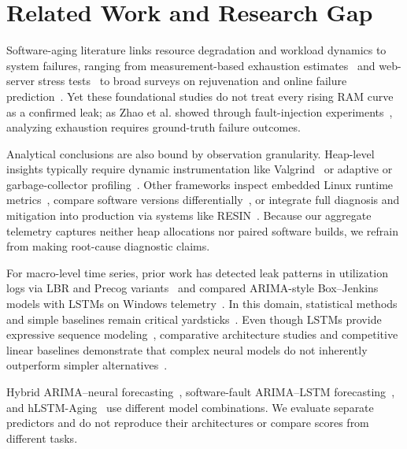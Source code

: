 \documentclass{llncs}
\begin{document}
\section{Related Work and Research Gap}
Software-aging literature links resource degradation and workload dynamics to system failures, ranging from measurement-based exhaustion estimates~\cite{ref8} and web-server stress tests~\cite{ref9} to broad surveys on rejuvenation and online failure prediction~\cite{ref10,ref22}. Yet these foundational studies do not treat every rising RAM curve as a confirmed leak; as Zhao et al. showed through fault-injection experiments~\cite{ref11}, analyzing exhaustion requires ground-truth failure outcomes.

Analytical conclusions are also bound by observation granularity. Heap-level insights typically require dynamic instrumentation like Valgrind~\cite{ref12} or adaptive or garbage-collector profiling~\cite{ref14,ref17}. Other frameworks inspect embedded Linux runtime metrics~\cite{ref19}, compare software versions differentially~\cite{ref20}, or integrate full diagnosis and mitigation into production via systems like RESIN~\cite{ref21}. Because our aggregate telemetry captures neither heap allocations nor paired software builds, we refrain from making root-cause diagnostic claims.

For macro-level time series, prior work has detected leak patterns in utilization logs via LBR and Precog variants~\cite{ref1} and compared ARIMA-style Box--Jenkins models with LSTMs on Windows telemetry~\cite{ref2}. In this domain, statistical methods and simple baselines remain critical yardsticks~\cite{ref24,ref25}. Even though LSTMs provide expressive sequence modeling~\cite{ref26}, comparative architecture studies and competitive linear baselines demonstrate that complex neural models do not inherently outperform simpler alternatives~\cite{ref28,ref32}.

Hybrid ARIMA--neural forecasting~\cite{ref29}, software-fault ARIMA--LSTM forecasting~\cite{ref30}, and hLSTM-Aging~\cite{ref31} use different model combinations. We evaluate separate predictors and do not reproduce their architectures or compare scores from different tasks.
\end{document}
